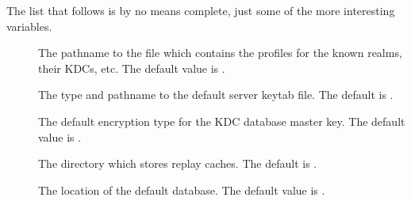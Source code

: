 \documentclass[letterpaper,10pt,english]{sphinxmanual}
\begin{document}
The list that follows is by no means complete, just some of the more
interesting variables.
\begin{description}
\item[{}] \leavevmode
The pathname to the file which contains the profiles for the known
realms, their KDCs, etc. The default value is .

\item[{}] \leavevmode
The type and pathname to the default server keytab file.  The
default is .

\item[{}] \leavevmode
The default encryption type for the KDC database master key.  The
default value is .

\item[{}] \leavevmode
The directory which stores replay caches.  The default is
.

\item[{}] \leavevmode
The location of the default database.  The default value is
.

\end{description}



\renewcommand{\indexname}{Index}
\printindex
\end{document}
